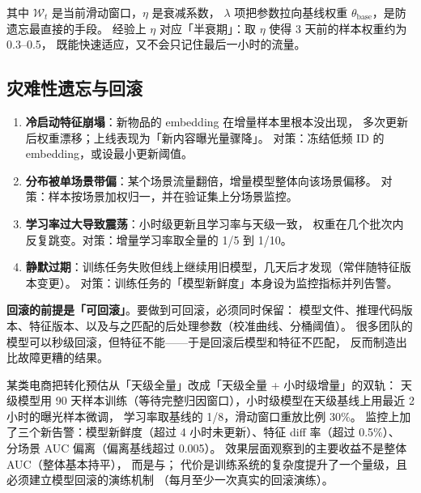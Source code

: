 其中 $\mathcal{W}_t$ 是当前滑动窗口，$\eta$ 是衰减系数，
$\lambda$ 项把参数拉向基线权重 $\theta_{\text{base}}$，是防遗忘最直接的手段。
经验上 $\eta$ 对应「半衰期」：取 $\eta$ 使得 3 天前的样本权重约为 0.3--0.5，
既能快速适应，又不会只记住最后一小时的流量。

\subsection{灾难性遗忘与回滚}

\begin{pitfall}[增量训练翻车的四种形态]
\begin{enumerate}
  \item \textbf{冷启动特征崩塌}：新物品的 embedding 在增量样本里根本没出现，
        多次更新后权重漂移；上线表现为「新内容曝光量骤降」。
        对策：冻结低频 ID 的 embedding，或设最小更新阈值。
  \item \textbf{分布被单场景带偏}：某个场景流量翻倍，增量模型整体向该场景偏移。
        对策：样本按场景加权归一，并在验证集上分场景监控。
  \item \textbf{学习率过大导致震荡}：小时级更新且学习率与天级一致，
        权重在几个批次内反复跳变。对策：增量学习率取全量的 1/5 到 1/10。
  \item \textbf{静默过期}：训练任务失败但线上继续用旧模型，几天后才发现（常伴随特征版本变更）。
        对策：训练任务的「模型新鲜度」本身设为监控指标并列告警。
\end{enumerate}
\end{pitfall}

\textbf{回滚的前提是「可回滚」}。要做到可回滚，必须同时保留：
模型文件、推理代码版本、特征版本、以及与之匹配的后处理参数（校准曲线、分桶阈值）。
很多团队的模型可以秒级回滚，但特征不能——于是回滚后模型和特征不匹配，
反而制造出比故障更糟的结果。

\begin{casebox}
某类电商把转化预估从「天级全量」改成「天级全量 + 小时级增量」的双轨：
天级模型用 90 天样本训练（等待完整归因窗口），小时级模型在天级基线上用最近 2 小时的曝光样本微调，
学习率取基线的 1/8，滑动窗口重放比例 30\%。
监控上加了三个新告警：模型新鲜度（超过 4 小时未更新）、特征 diff 率（超过 0.5\%）、
分场景 AUC 偏离（偏离基线超过 0.005）。
效果层面观察到的主要收益不是整体 AUC（整体基本持平），
而是与；
代价是训练系统的复杂度提升了一个量级，且必须建立模型回滚的演练机制
（每月至少一次真实的回滚演练）。
\end{casebox}

